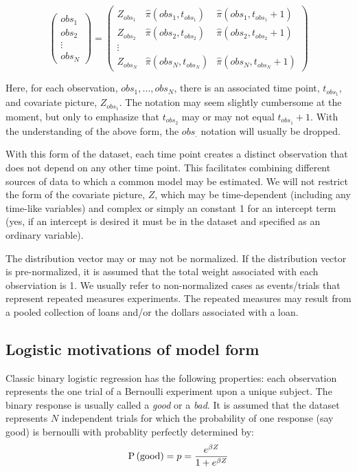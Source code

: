 \documentclass[10pt]{article}
\begin{document}
\begin{equation*}
\begin{pmatrix}
obs_1 \\
obs_2 \\
\vdots \\
obs_N
\end{pmatrix}
=
\begin{pmatrix}
Z_{obs_1} & \widehat{\pi}(obs_1,t_{obs_1}) & \widehat{\pi}(obs_1,t_{obs_1}+1) \\
Z_{obs_2} & \widehat{\pi}(obs_2,t_{obs_2}) & \widehat{\pi}(obs_2,t_{obs_2}+1) \\
\vdots \\
Z_{obs_N} & \widehat{\pi}(obs_N,t_{obs_N}) & \widehat{\pi}(obs_N,t_{obs_N}+1) 
\end{pmatrix}
\end{equation*}

Here, for each observation, $obs_1, \ldots, obs_N$, there is an associated time point, $t_{obs_1}$, and covariate picture, $Z_{obs_1}$.
The notation may seem slightly cumbersome at the moment, but only to emphasize that $t_{obs_2}$ may or may not equal $t_{obs_1}+1$. 
With the understanding of the above form, the $obs_{.}$ notation will usually be dropped.

With this form of the dataset, each time point creates a distinct observation that does not depend on any other time point. This facilitates 
combining  different sources of data to which a common model may be estimated.   We will not restrict the form of the covariate picture, $Z$, 
which may be time-dependent (including any time-like variables) and complex or simply an constant 1 
for an intercept term (yes, if an intercept is desired it must be in the dataset and specified as an ordinary variable).

The distribution vector may or may not be normalized.  If the distribution vector is pre-normalized, it is assumed that the total weight 
associated with each observiation is 1.  We usually refer to non-normalized cases as events/trials that represent repeated measures experiments.
The repeated measures may result from a pooled collection of loans and/or the dollars associated with a loan.


\subsection{Logistic motivations of model form}

Classic binary logistic regression has the following properties: each observation represents the one trial of a Bernoulli experiment upon a 
unique subject.  The binary response is usually called a {\em good} or a {\em bad}. 
It is assumed that the dataset represents $N$ independent trials for which the probability of one response (say good) is bernoulli with probablity perfectly determined by:
$$\text{P}\left({\text{good}}\right)=p={e^{\beta Z}\over 1+e^{\beta Z}}$$
\end{document}
